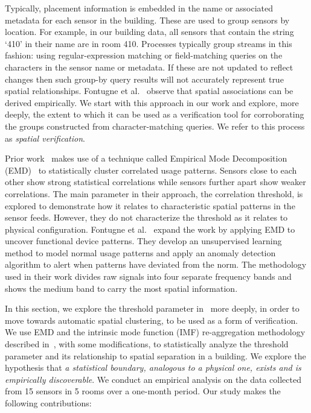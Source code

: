Typically, placement information is embedded in the name or associated metadata for each sensor in the building.
These are used to group sensors by location.  For example, in our building data, all sensors that contain the string
 `410' in their name are in room 410.  Processes typically group streams in this fashion: using regular-expression matching 
or field-matching queries on the characters in the sensor name or metadata.  If these are not updated to reflect changes
then such group-by query results will not accurately represent true spatial relationships.  
Fontugne et al.~\cite{IOT} observe that spatial associations can be derived empirically.  We start with this approach in our 
work and explore, more deeply, the extent to which it can be used 
as a verification tool for corroborating the groups constructed from character-matching queries.  We refer
to this process as \emph{spatial verification}.

Prior work~\cite{IOT} makes use of a technique called Empirical Mode Decomposition (EMD)~\cite{EMD} to statistically cluster correlated
usage patterns.  Sensors close to each other show strong statistical correlations while sensors further apart show weaker correlations.  
The main parameter in their approach, the correlation threshold, is explored to demonstrate how it relates to characteristic spatial patterns
 in the sensor feeds.  However, they do not characterize the threshold as it relates to physical configuration.
Fontugne et al.~\cite{SBS} expand the work by applying EMD to uncover functional device patterns.  They develop
an unsupervised learning method to model normal usage patterns and apply an anomaly detection algorithm to alert when patterns
have deviated from the norm.  The methodology used in their work divides raw signals into four separate frequency bands
and shows the medium band to carry the most spatial information.

In this section, we explore the threshold parameter in~\cite{IOT} more deeply, in order to move towards automatic spatial clustering, 
to be used as a form of verification. We use EMD and the intrinsic mode function (IMF) re-aggregation methodology described in~\cite{SBS}, with some modifications, to statistically analyze the threshold parameter
and its relationship to spatial separation in a building.  We explore the hypothesis that \emph{a statistical boundary, analogous to a physical one,
exists and is empirically discoverable}.
We conduct an empirical analysis on the data collected from 15 sensors in 5 rooms over a one-month period.  Our study makes the following contributions:


